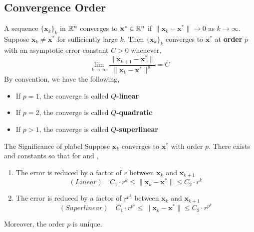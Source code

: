 \subsection{Convergence Order}
\begin{defn}[$Q$-Convergence]
    \sloppy A sequence $\{\mathbf{x}_k\}_k$ in $\mathbb{R}^n$ converges to $\mathbf{x}^* \in \mathbb{R}^n$ if $\|\mathbf{x}_k - \mathbf{x}^*\| \rightarrow 0$ as $k \rightarrow \infty$. Suppose $\mathbf{x}_k \neq \mathbf{x}^*$ for sufficiently large $k$. Then $\{\mathbf{x}_k\}_k$ converges to $\mathbf{x}^*$ at \textbf{order} $p$ with an asymptotic error constant $C > 0$ whenever,
    \[\lim_{k \rightarrow \infty} \frac{\|\mathbf{x}_{k+1} - \mathbf{x}^*\|}{\|\mathbf{x}_k - \mathbf{x}^*\|^p}  = C\]
    By convention, we have the following,
    \begin{itemize}
        \item If $p = 1$, the converge is called \textbf{$Q$-linear}
        \item If $p = 2$, the converge is called \textbf{$Q$-quadratic}
        \item If $p > 1$, the converge is called \textbf{$Q$-superlinear}
    \end{itemize}
\end{defn}


\begin{ex}{The Significance of $p$}{label}
    Suppose $\mathbf{x}_k$ converges to $\mathbf{x}^*$ with order $p$. There exists  and constants  so that for  and ,
    \begin{enumerate}
        \item The error is reduced by a factor of $r$ between $\mathbf{x}_k$ and $\mathbf{x}_{k+1}$
        \[(Linear) \quad C_1 \cdot r^k \leq \|\mathbf{x}_k - \mathbf{x}^* \| \leq C_2 \cdot  r^k\]
        \item The error is reduced by a factor of $r^{p^k}$ between $\mathbf{x}_k$ and $\mathbf{x}_{k+1}$
        \[(Superlinear) \quad C_1 \cdot  r^{p^k} \leq \|\mathbf{x}_k - \mathbf{x}^* \| \leq C_2 \cdot r^{p^k}\]
    \end{enumerate}
    Moreover, the order $p$ is unique. 
\end{ex}

